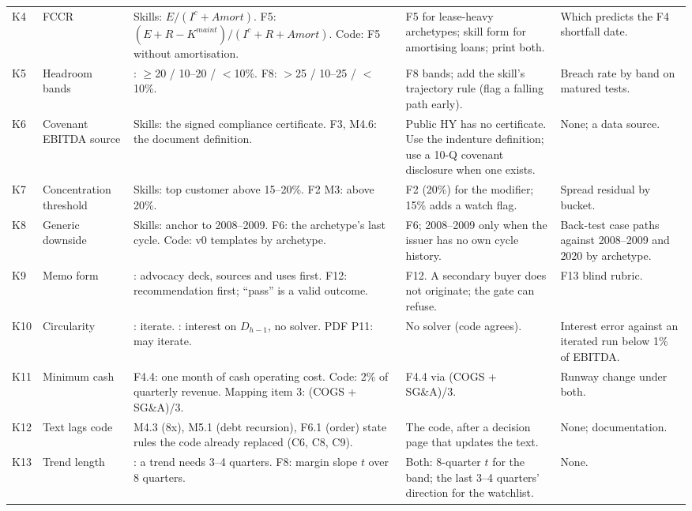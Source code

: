 \documentclass[11pt]{article}
\begin{document}
{\begin{xltabular}{\linewidth}{@{}>{\raggedright\arraybackslash}p{9mm}>{\raggedright\arraybackslash}p{24mm}>{\raggedright\arraybackslash}X>{\raggedright\arraybackslash}p{38mm}>{\raggedright\arraybackslash}p{30mm}@{}}
K4 & FCCR & Skills: $E/(I^c + Amort)$. F5: $(E + R - K^{maint})/(I^c + R + Amort)$. Code: F5 without amortisation. & F5 for lease-heavy archetypes; skill form for amortising loans; print both. & Which predicts the F4 shortfall date. \\
K5 & Headroom bands & : $\ge$20 / 10--20 / $<$10\%. F8: $>$25 / 10--25 / $<$10\%. & F8 bands; add the skill's trajectory rule (flag a falling path early). & Breach rate by band on matured tests. \\
K6 & Covenant EBITDA source & Skills: the signed compliance certificate. F3, M4.6: the document definition. & Public HY has no certificate. Use the indenture definition; use a 10-Q covenant disclosure when one exists. & None; a data source. \\
K7 & Concentration threshold & Skills: top customer above 15--20\%. F2 M3: above 20\%. & F2 (20\%) for the modifier; 15\% adds a watch flag. & Spread residual by bucket. \\
K8 & Generic downside & Skills: anchor to 2008--2009. F6: the archetype's last cycle. Code: v0 templates by archetype. & F6; 2008--2009 only when the issuer has no own cycle history. & Back-test case paths against 2008--2009 and 2020 by archetype. \\
K9 & Memo form & : advocacy deck, sources and uses first. F12: recommendation first; ``pass'' is a valid outcome. & F12. A secondary buyer does not originate; the gate can refuse. & F13 blind rubric. \\
K10 & Circularity & : iterate. : interest on $D_{h-1}$, no solver. PDF P11: may iterate. & No solver (code agrees). & Interest error against an iterated run below 1\% of EBITDA. \\
K11 & Minimum cash & F4.4: one month of cash operating cost. Code: 2\% of quarterly revenue. Mapping item 3: (COGS + SG\&A)/3. & F4.4 via (COGS + SG\&A)/3. & Runway change under both. \\
K12 & Text lags code & M4.3 (8x), M5.1 (debt recursion), F6.1 (order) state rules the code already replaced (C6, C8, C9). & The code, after a decision page that updates the text. & None; documentation. \\
K13 & Trend length & : a trend needs 3--4 quarters. F8: margin slope $t$ over 8 quarters. & Both: 8-quarter $t$ for the band; the last 3--4 quarters' direction for the watchlist. & None. \\

\end{xltabular}}
\end{document}
